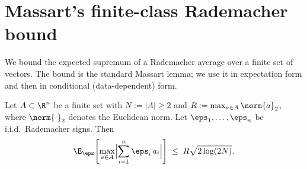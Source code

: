 \section{Massart's finite-class Rademacher bound}\label{sec:massart}

We bound the expected supremum of a Rademacher average over a finite set of vectors. The bound is the standard Massart lemma; we use it in expectation form and then in conditional (data-dependent) form.

\begin{lemma}\label{lem:massart}
Let $A \subset \R^n$ be a finite set with $N := |A| \ge 2$ and $R := \max_{a \in A} \norm{a}_2$, where $\norm{\cdot}_2$ denotes the Euclidean norm. Let $\eps_1, \ldots, \eps_n$ be i.i.d.\ Rademacher signs. Then
\begin{align}\label{eq:massart-abs}
\E_{\eps}\!\left[ \max_{a \in A} \Bigl| \sum_{i=1}^{n} \eps_i\, a_i \Bigr| \right]
\;\le\;
R \sqrt{2 \log(2 N)}.
\end{align}
\end{lemma}

